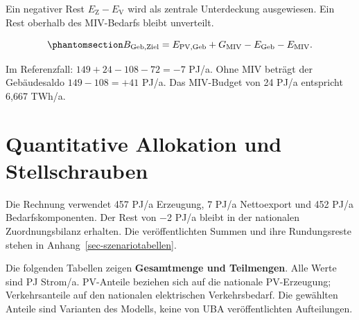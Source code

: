\documentclass[
  ngerman,
  a4paper,
  DIV=11]{scrreprt}
\begin{document}
Ein negativer Rest \(E_{\mathrm{Z}}-E_{\mathrm{V}}\) wird als zentrale
Unterdeckung ausgewiesen. Ein Rest oberhalb des MIV-Bedarfs bleibt
unverteilt.

\begin{equation}\protect\phantomsection\label{eq-gebaeudesektor-zielsaldo}{
B_{\mathrm{Geb,Ziel}}=E_{\mathrm{PV,Geb}}+G_{\mathrm{MIV}}-E_{\mathrm{Geb}}-E_{\mathrm{MIV}}.
}\end{equation}

Im Referenzfall: \(149+24-108-72=-7\) PJ/a. Ohne MIV beträgt der
Gebäudesaldo \(149-108=+41\) PJ/a. Das MIV-Budget von 24 PJ/a entspricht
6,667 TWh/a.

\section{Quantitative Allokation und
Stellschrauben}\label{sec-allokation-ergebnisse}

Die Rechnung verwendet 457 PJ/a Erzeugung, 7 PJ/a Nettoexport und 452
PJ/a Bedarfskomponenten. Der Rest von −2 PJ/a bleibt in der nationalen
Zuordnungsbilanz erhalten. Die veröffentlichten Summen und ihre
Rundungsreste stehen in Anhang~\ref{sec-szenariotabellen}.

Die folgenden Tabellen zeigen \textbf{Gesamtmenge und Teilmengen}. Alle
Werte sind PJ Strom/a. PV-Anteile beziehen sich auf die nationale
PV-Erzeugung; Verkehrsanteile auf den nationalen elektrischen
Verkehrsbedarf. Die gewählten Anteile sind Varianten des Modells, keine
von UBA veröffentlichten Aufteilungen.
\end{document}
